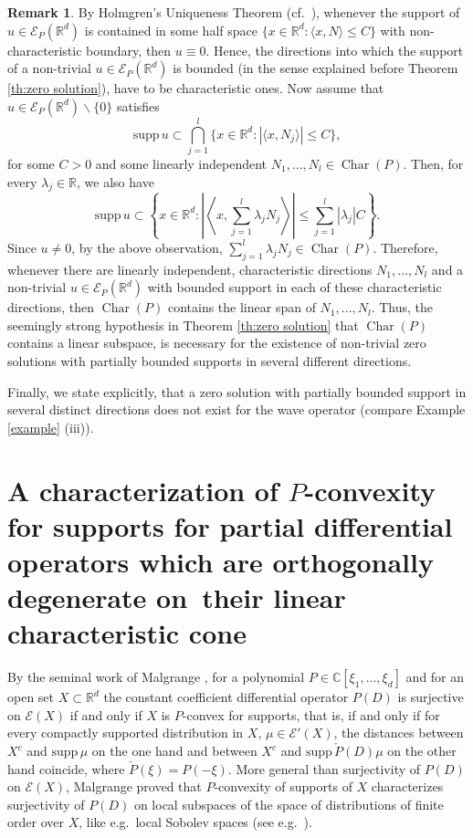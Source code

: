 \documentclass[a4paper,10pt]{amsart}
\newtheorem*{crucial lemma}{Lemma \ref{lem:nice polynomial2}}
\theoremstyle{definition}
\newtheorem{remark}[theorem]{Remark}
\newcommand{\R}{\mathbb{R}}
\newcommand{\C}{\mathbb{C}}
\newcommand{\supp}{\mbox{supp}\,}
\newcommand{\charcone}{\operatorname{Char}}
\newcommand{\veryniceon}[1]{orthogonally degenerate on~#1}
\begin{document}
\begin{remark}\label{rem:partially bounded support}
    By Holmgren's Uniqueness Theorem (cf.~\cite[Theorem 8.6.5]{Hor1}), whenever the support of $u\in\mathscr{E}_P(\R^d)$ is contained in some half space $\{x\in\R^d\colon \langle x,N\rangle\leq C\}$ with non-characteristic boundary, then $u\equiv 0$. Hence, the directions into which the support of a non-trivial $u\in\mathscr{E}_P(\R^d)$ is bounded (in the sense explained before Theorem \ref{th:zero solution}), have to be characteristic ones. Now assume that $u\in\mathscr{E}_P(\R^d)\backslash\{0\}$ satisfies
    \[\supp u\subset\bigcap_{j=1}^l\{x\in\R^d\colon \left|\langle x,N_j\rangle\right|\leq C\},\]
    for some $C>0$ and some linearly independent $N_1,\ldots,N_l\in\charcone(P)$. Then, for every $\lambda_j\in\R$, we also have
    \[\supp u\subset \left\{x\in\R^d\colon \left|\left\langle x,\sum_{j=1}^l \lambda_j N_j\right\rangle\right|\leq \sum_{j=1}^l|\lambda_j| C\right\}.\]
    Since $u\neq 0$, by the above observation, $\sum_{j=1}^l \lambda_j N_j\in\charcone(P)$. Therefore, whenever there are linearly independent, characteristic directions $N_1,\ldots, N_l$ and a non-trivial $u\in\mathscr{E}_P(\R^d)$ with bounded support in each of these characteristic directions, then $\charcone(P)$ contains the linear span of $N_1,\ldots, N_l$. Thus, the seemingly strong hypothesis in Theorem \ref{th:zero solution} that $\charcone(P)$ contains a linear subspace, is necessary for the existence of non-trivial zero solutions with partially bounded supports in several different directions.
    
    Finally, we state explicitly, that a zero solution with partially bounded support in several distinct directions does not exist for the wave operator (compare Example \ref{example} (iii)).
\end{remark}

\section{A characterization of \texorpdfstring{$P$}{P}-convexity for supports for partial differential operators which are \veryniceon{their linear characteristic cone}}\label{sec:p-convexity}

By the seminal work of Malgrange \cite{Malgrange1955}, for a polynomial $P\in\C[\xi_1,\ldots,\xi_d]$ and for an open set $X\subset\R^d$ the constant coefficient differential operator $P(D)$ is surjective on $\mathscr{E}(X)$ if and only if $X$ is $P$-convex for supports, that is, if and only if for every compactly supported distribution in $X$, $\mu\in\mathscr{E}'(X)$, the distances between $X^c$ and $\supp\mu$ on the one hand and between $X^c$ and $\supp\check{P}(D)\mu$ on the other hand coincide, where $\check{P}(\xi)=P(-\xi)$. More general than surjectivity of $P(D)$ on $\mathscr{E}(X)$, Malgrange proved that $P$-convexity of supports of $X$ characterizes surjectivity of $P(D)$ on local subspaces of the space of distributions of finite order over $X$, like e.g.~local Sobolev spaces (see e.g.~\cite[Section 10.6]{Hor2}).
\end{document}
